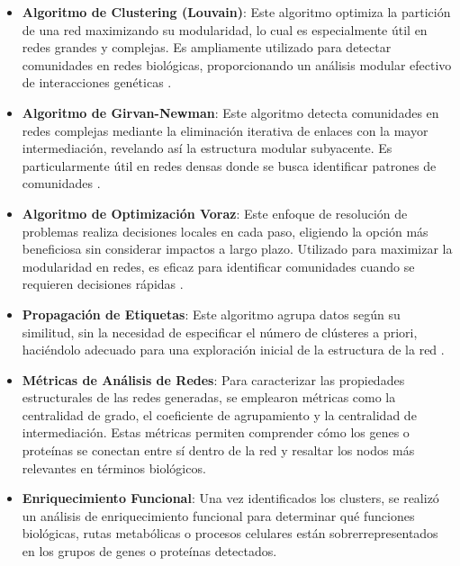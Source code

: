\begin{itemize}
	\item \textbf{Algoritmo de Clustering (Louvain)}: Este algoritmo optimiza la partición de una red maximizando su modularidad, lo cual es especialmente útil en redes grandes y complejas. Es ampliamente utilizado para detectar comunidades en redes biológicas, proporcionando un análisis modular efectivo de interacciones genéticas \cite{Blondel2008}.
	
	\item \textbf{Algoritmo de Girvan-Newman}: Este algoritmo detecta comunidades en redes complejas mediante la eliminación iterativa de enlaces con la mayor intermediación, revelando así la estructura modular subyacente. Es particularmente útil en redes densas donde se busca identificar patrones de comunidades \cite{Girvan2002}.
	
	\item \textbf{Algoritmo de Optimización Voraz}: Este enfoque de resolución de problemas realiza decisiones locales en cada paso, eligiendo la opción más beneficiosa sin considerar impactos a largo plazo. Utilizado para maximizar la modularidad en redes, es eficaz para identificar comunidades cuando se requieren decisiones rápidas \cite{Fortunato2010}.
	
	\item \textbf{Propagación de Etiquetas}: Este algoritmo agrupa datos según su similitud, sin la necesidad de especificar el número de clústeres a priori, haciéndolo adecuado para una exploración inicial de la estructura de la red \cite{Raghavan2007}.
	
	\item \textbf{Métricas de Análisis de Redes}: Para caracterizar las propiedades estructurales de las redes generadas, se emplearon métricas como la centralidad de grado, el coeficiente de agrupamiento y la centralidad de intermediación. Estas métricas permiten comprender cómo los genes o proteínas se conectan entre sí dentro de la red y resaltar los nodos más relevantes en términos biológicos.
	
	\item \textbf{Enriquecimiento Funcional}: Una vez identificados los clusters, se realizó un análisis de enriquecimiento funcional para determinar qué funciones biológicas, rutas metabólicas o procesos celulares están sobrerrepresentados en los grupos de genes o proteínas detectados. 
\end{itemize}



